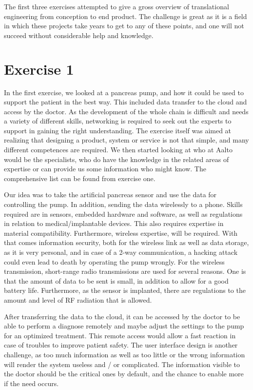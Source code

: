 \documentclass[english,12pt,a4paper,pdftex,elec,utf8]{aaltothesis}
\begin{document}
	The first three exercises attempted to give a gross overview of translational engineering from conception to end product. The challenge is great as it is a field in which these projects take years to get to any of these points, and one will not succeed without considerable help and knowledge. 
	


\newpage


\section*{Exercise 1}

	In the first exercise, we looked at a pancreas pump, and how it could be used to support the patient in the best way. This included data transfer to the cloud and access by the doctor. As the development of the whole chain is difficult and needs a variety of different skills, networking is required to seek out the experts to support in gaining the right understanding. The exercise itself was aimed at realizing that designing a product, system or service is not that simple, and many different competences are required. We then started looking at who at Aalto would be the specialists, who do have the knowledge in the related areas of expertise or can provide us some information who might know. The comprehensive list can be found from exercise one. 

	Our idea was to take the artificial pancreas sensor and use the data for controlling the pump. In addition, sending the data wirelessly to a phone. Skills required are in sensors, embedded hardware and software, as well as regulations in relation to medical/implantable devices. This also requires expertise in material compatibility. Furthermore, wireless expertise, will be required. With that comes information security, both for the wireless link as well as data storage, as it is very personal, and in case of a 2-way communication, a hacking attack could even lead to death by operating the pump wrongly. For the wireless transmission, short-range radio transmissions are used for several reasons. One is that the amount of data to be sent is small, in addition to allow for a good battery life. Furthermore, as the sensor is implanted, there are regulations to the amount and level of RF radiation that is allowed. 

	After transferring the data to the cloud, it can be accessed by the doctor to be able to perform a diagnose remotely and maybe adjust the settings to the pump for an optimized treatment. This remote access would allow a fast reaction in case of troubles to improve patient safety. The user interface design is another challenge, as too much information as well as too little or the wrong information will render the system useless and / or complicated. The information visible to the doctor should be the critical ones by default, and the chance to enable more if the need occurs. 
	
\end{document}
